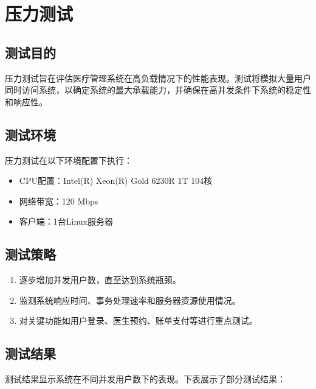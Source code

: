 \section{压力测试}
\subsection{测试目的}
压力测试旨在评估医疗管理系统在高负载情况下的性能表现。测试将模拟大量用户同时访问系统，以确定系统的最大承载能力，并确保在高并发条件下系统的稳定性和响应性。

\subsection{测试环境}
压力测试在以下环境配置下执行：
\begin{itemize}
	\item CPU配置：Intel(R) Xeon(R) Gold 6230R 1T 104核
	\item 网络带宽：120 Mbps
	\item 客户端：1台Linux服务器
\end{itemize}

\subsection{测试策略}
\begin{enumerate}
	\item 逐步增加并发用户数，直至达到系统瓶颈。
	\item 监测系统响应时间、事务处理速率和服务器资源使用情况。
	\item 对关键功能如用户登录、医生预约、账单支付等进行重点测试。
\end{enumerate}

\subsection{测试结果}
测试结果显示系统在不同并发用户数下的表现。下表展示了部分测试结果：

\begin{table}[h]
	\centering
	\caption{压力测试结果}
\end{table}

